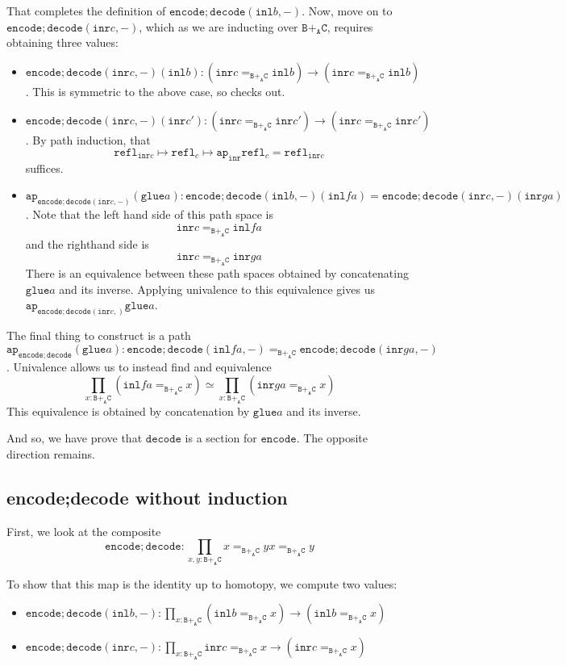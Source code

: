 \documentclass[12pt]{amsart}
\newcommand{\from}{\colon}
\newcommand{\type}[1]{\mathtt{#1}}
\newcommand{\tin}{\colon}
\newcommand{\A}{\type{A}}
\newcommand{\B}{\type{B}}
\newcommand{\C}{\type{C}}
\newcommand{\BAC}{\B +_{\A} \C}
\newcommand{\ap}{\type{ap}}
\newcommand{\inl}{\type{inl}}
\newcommand{\inr}{\type{inr}}
\newcommand{\glue}{\type{glue}}
\newcommand{\refl}{\type{refl}}
\newcommand{\encode}{\type{encode}}
\newcommand{\decode}{\type{decode}}
\theoremstyle{remark}
\theoremstyle{definition}
\begin{document}
That completes the definition of \( \encode ; \decode (\inl b, -)
\). Now, move on to \( \encode ; \decode ( \inr c, - ) \), which as we
are inducting over \( \BAC \), requires obtaining three values:
\begin{itemize}
\item
  \( \encode ; \decode ( \inr c , - ) ( \inl b ) \from ( \inr c
  =_{\BAC} \inl b ) \to ( \inr c =_{\BAC} \inl b )  \). This is
  symmetric to the above case, so checks out. 
\item
  \( \encode ; \decode ( \inr c , - ) ( \inr c' ) \from ( \inr c
  =_{\BAC} \inr c' ) \to ( \inr c =_{\BAC} \inr c' )  \). By path
  induction, that
  \[
    \refl_{\inr c} \mapsto \refl_c \mapsto \ap_{\inr} \refl_c =
    \refl_{\inr c}
  \]
  suffices.  
\item
  \( \ap_{\encode ; \decode ( \inr c, -)} (\glue a) \tin \encode ; \decode
  (\inl b , -)(\inl fa) = \encode ; \decode (\inr c , -)(\inr ga)
  \).  Note that the left hand side of this path space is
  \[
    \inr c =_{\BAC} \inl fa
  \]
  and the righthand side is
  \[
    \inr c =_{\BAC} \inr ga
  \]
  There is an equivalence between these path spaces obtained by
  concatenating \( \glue a \) and its inverse. Applying univalence to
  this equivalence gives us \( \ap_{\encode ; \decode (\inr c , )}
  \glue a \).
\end{itemize}

The final thing to construct is a path
\( \ap_{\encode ; \decode} (\glue a ) \tin \encode ; \decode ( \inl fa
, - ) =_{\BAC} \encode ; \decode (\inr ga , -) \). Univalence allows
us to instead find and equivalence
\[
  \prod\limits_{x \tin \BAC} ( \inl fa =_{\BAC} x )
  \simeq
  \prod\limits_{x \tin \BAC} ( \inr ga =_{\BAC} x )
\]
This equivalence is obtained by concatenation by \( \glue a \) and its
inverse.

And so, we have prove that \( \decode \) is a section for \( \encode
\). The opposite direction remains.

\subsection{encode;decode without induction}

First, we look at the composite
\[
  \encode ; \decode
  \from
  \prod\limits_{x,y \tin \BAC} x =_{\BAC} y
  x =_{\BAC} y
\]

To show that this map is the identity up to homotopy, we compute two values:
\begin{itemize}
\item
  \( \encode ; \decode ( \inl b , - ) \from \prod\limits_{x \tin
  \BAC} ( \inl b =_{\BAC} x ) \to ( \inl b =_{\BAC} x ) \)
\item
  \( \encode ; \decode ( \inr c , - ) \from \prod\limits_{x \tin
  \BAC} \inr c =_{\BAC} x \to ( \inr c =_{\BAC} x ) \)
\end{itemize}
\end{document}
